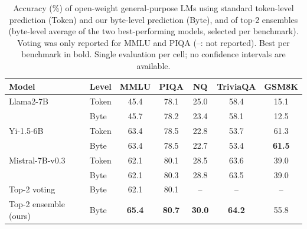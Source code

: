 \begin{table}[t]
\caption{Accuracy (\%) of open-weight general-purpose LMs using standard token-level prediction (Token) and our byte-level prediction (Byte), and of top-2 ensembles (byte-level average of the two best-performing models, selected per benchmark). Voting was only reported for MMLU and PIQA (--: not reported). Best per benchmark in bold. Single evaluation per cell; no confidence intervals are available.}
\label{tab:general}
\begin{center}
\small
\setlength{\tabcolsep}{4.5pt}
\begin{tabular}{llccccc}
\toprule
Model & Level & MMLU & PIQA & NQ & TriviaQA & GSM8K \\
\midrule
Llama2-7B & Token & 45.4 & 78.1 & 25.0 & 58.4 & 15.1 \\
 & Byte & 45.7 & 78.2 & 23.4 & 58.1 & 12.5 \\
\addlinespace[2pt]
Yi-1.5-6B & Token & 63.4 & 78.5 & 22.8 & 53.7 & 61.3 \\
 & Byte & 63.4 & 78.5 & 22.7 & 53.4 & \textbf{61.5} \\
\addlinespace[2pt]
Mistral-7B-v0.3 & Token & 62.1 & 80.1 & 28.5 & 63.6 & 39.0 \\
 & Byte & 62.1 & 80.3 & 28.8 & 63.5 & 39.0 \\
\midrule
Top-2 voting & Byte & 62.1 & 80.1 & -- & -- & -- \\
Top-2 ensemble (ours) & Byte & \textbf{65.4} & \textbf{80.7} & \textbf{30.0} & \textbf{64.2} & 55.8 \\
\bottomrule
\end{tabular}
\end{center}
\end{table}
